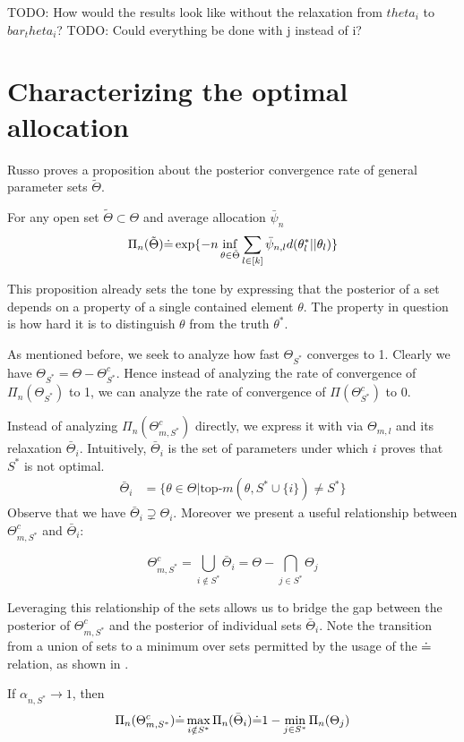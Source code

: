 TODO: How would the results look like without the relaxation from $theta_i$ to $bar_theta_i$?
TODO: Could everything be done with j instead of i?

\section{Characterizing the optimal allocation}\label{section:optimal_statements}
Russo proves a proposition about the posterior convergence rate of general parameter sets $\tilde{\Theta}$.

\begin{proposition}\label{proposition:prop5}
  For any open set $\tilde{\Theta} \subset \Theta$ and average allocation $\bar{\psi}_n$
  \[\Pi_n(\tilde{\Theta}) \dot{=} \exp\{-n \inf_{\theta \in \tilde{\Theta}} \sum_{l \in [k]} \bar{\psi}_{n, l} d(\theta^*_l || \theta_l)\}\]
\end{proposition}

This proposition already sets the tone by expressing that the posterior of a set depends on a property of a single contained element $\theta$. The property in question is how hard it is to distinguish $\theta$ from the truth $\theta^*$.

As mentioned before, we seek to analyze how fast $\Theta_{S^*}$ converges to 1. Clearly we have $\Theta_{S^*} = \Theta - \Theta_{S^*}^c$. Hence instead of analyzing the rate of convergence of $\Pi_n(\Theta_{S^*})$ to 1, we can analyze the rate of convergence of $\Pi(\Theta_{S^*}^c)$ to 0.

Instead of analyzing $\Pi_n(\Theta_{m, S^*}^c)$ directly, we express it with via $\Theta_{m, l}$ and its relaxation $\bar{\Theta}_i$. Intuitively, $\bar{\Theta}_i$ is the set of parameters under which $i$ proves that $S^*$ is not optimal.
\begin{align}
    \bar{\Theta}_i &= \{ \theta \in \Theta | \text{top-}m(\theta, S^* \cup \{i\}) \neq S^*\}
\end{align}
Observe that we have $\bar{\Theta}_i \supsetneq \Theta_i$. Moreover we present a useful relationship between $\Theta_{m, S^*}^c$ and $\bar{\Theta}_i$:
\begin{lemma}\label{lemma:set_relation_S*_i}
  \[\Theta_{m, S^*}^c = \bigcup_{i \notin S^*} \bar{\Theta}_i = \Theta - \bigcap_{j \in S^*} \Theta_j\]
\end{lemma}
Leveraging this relationship of the sets allows us to bridge the gap between the posterior of $\Theta_{m, S^*}^c$ and the posterior of individual sets $\bar{\Theta}_i$. Note the transition from a union of sets to a minimum over sets permitted by the usage of the $\dot{=}$ relation, as shown in .
\begin{lemma}\label{lemma:posterior_S*_i} If $\alpha_{n, S^*} \rightarrow 1$, then
  \begin{align}
    \Pi_n(\Theta_{m, S^*}^c) \dot{=} \max_{i \notin S^*} \Pi_n(\bar{\Theta}_i) \dot{=} 1 - \min_{j \in S^*} \Pi_n(\Theta_j)
  \end{align}
\end{lemma}


